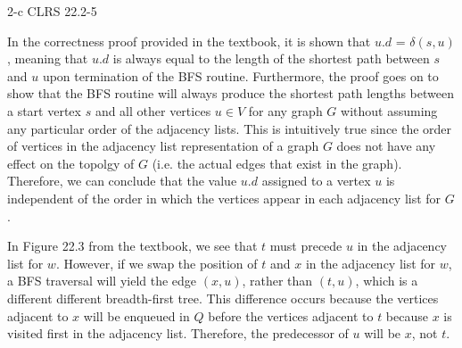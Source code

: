 \documentclass[11pt]{article}
\begin{document}
\begin{prob}{2-c}
CLRS 22.2-5 
\end{prob}
\begin{sol} 

In the correctness proof provided in the textbook, it is shown that $u.d$ = $\delta(s,u)$, meaning that $u.d$ is always equal to the length of the shortest path between $s$ and $u$ upon termination of the BFS routine. Furthermore, the proof goes on to show that the BFS routine will always produce the shortest path lengths between a start vertex $s$ and all other vertices $u \in V$ for any graph $G$ without assuming any particular order of the adjacency lists. This is intuitively true since the order of vertices in the adjacency list representation of a graph $G$ does not have any effect on the topolgy of $G$ (i.e. the actual edges that exist in the graph). Therefore, we can conclude that the value $u.d$ assigned to a vertex $u$ is independent of the order in which the vertices appear in each adjacency list for $G$.

In Figure 22.3 from the textbook, we see that $t$ must precede $u$ in the adjacency list for $w$. However, if we swap the position of $t$ and $x$ in the adjacency list for $w$, a BFS traversal will yield the edge $(x,u)$, rather than $(t,u)$, which is a different different breadth-first tree. This difference occurs because the vertices adjacent to $x$ will be enqueued in $Q$ before the vertices adjacent to $t$ because $x$ is visited first in the adjacency list. Therefore, the predecessor of $u$ will be $x$, not $t$.

\end{sol}
\end{document}
